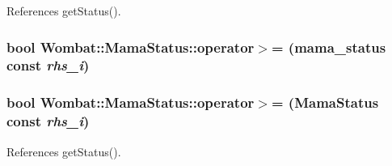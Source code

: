 References getStatus().\hypertarget{classWombat_1_1MamaStatus_aad404529e433f463c7675185c4929aea}{
\subsubsection[{operator$>$=}]{\setlength{\rightskip}{0pt plus 5cm}bool Wombat::MamaStatus::operator$>$= (mama\_\-status const  {\em rhs\_\-i})}}
\label{classWombat_1_1MamaStatus_aad404529e433f463c7675185c4929aea}
\hypertarget{classWombat_1_1MamaStatus_a46a8e3636b33569d27d8d3c19060c8e3}{
\subsubsection[{operator$>$=}]{\setlength{\rightskip}{0pt plus 5cm}bool Wombat::MamaStatus::operator$>$= ({\bf MamaStatus} const  {\em rhs\_\-i})}}
\label{classWombat_1_1MamaStatus_a46a8e3636b33569d27d8d3c19060c8e3}


References getStatus().